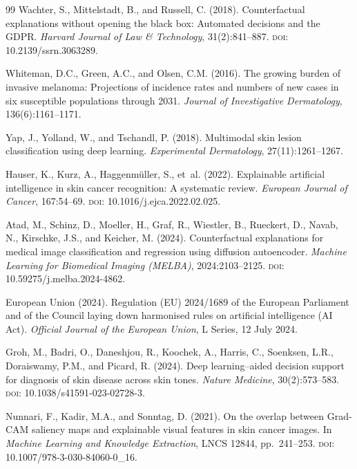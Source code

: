 \documentclass[12pt, a4paper]{article}
\begin{document}
\begin{thebibliography}{99}
Wachter, S., Mittelstadt, B., and Russell, C. (2018).
\newblock Counterfactual explanations without opening the black box: Automated decisions and the {GDPR}.
\newblock \emph{Harvard Journal of Law \& Technology}, 31(2):841--887.
\newblock \textsc{doi}: 10.2139/ssrn.3063289.

Whiteman, D.C., Green, A.C., and Olsen, C.M. (2016).
\newblock The growing burden of invasive melanoma: Projections of incidence rates and numbers of new cases in six susceptible populations through 2031.
\newblock \emph{Journal of Investigative Dermatology}, 136(6):1161--1171.

Yap, J., Yolland, W., and Tschandl, P. (2018).
\newblock Multimodal skin lesion classification using deep learning.
\newblock \emph{Experimental Dermatology}, 27(11):1261--1267.

Hauser, K., Kurz, A., Haggenm\"{u}ller, S., et~al. (2022).
\newblock Explainable artificial intelligence in skin cancer recognition: A systematic review.
\newblock \emph{European Journal of Cancer}, 167:54--69.
\newblock \textsc{doi}: 10.1016/j.ejca.2022.02.025.

Atad, M., Schinz, D., Moeller, H., Graf, R., Wiestler, B., Rueckert, D., Navab, N., Kirschke, J.S., and Keicher, M. (2024).
\newblock Counterfactual explanations for medical image classification and regression using diffusion autoencoder.
\newblock \emph{Machine Learning for Biomedical Imaging (MELBA)}, 2024:2103--2125.
\newblock \textsc{doi}: 10.59275/j.melba.2024-4862.

{European Union} (2024).
\newblock Regulation ({EU}) 2024/1689 of the {European} Parliament and of the Council laying down harmonised rules on artificial intelligence ({AI Act}).
\newblock \emph{Official Journal of the European Union}, L Series, 12 July 2024.

Groh, M., Badri, O., Daneshjou, R., Koochek, A., Harris, C., Soenksen, L.R., Doraiswamy, P.M., and Picard, R. (2024).
\newblock Deep learning--aided decision support for diagnosis of skin disease across skin tones.
\newblock \emph{Nature Medicine}, 30(2):573--583.
\newblock \textsc{doi}: 10.1038/s41591-023-02728-3.

Nunnari, F., Kadir, M.A., and Sonntag, D. (2021).
\newblock On the overlap between {Grad-CAM} saliency maps and explainable visual features in skin cancer images.
\newblock In \emph{Machine Learning and Knowledge Extraction}, LNCS 12844, pp.~241--253.
\newblock \textsc{doi}: 10.1007/978-3-030-84060-0\_16.


\end{thebibliography}
\end{document}
